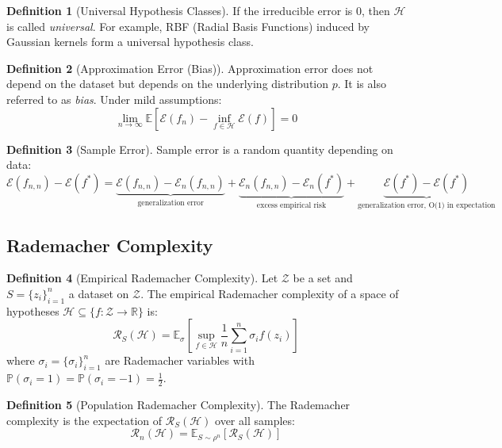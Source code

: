 \documentclass[12pt,a4paper]{article}
\theoremstyle{definition}
\newtheorem{definition}{Definition}[section]
\begin{document}
\begin{definition}[Universal Hypothesis Classes]
If the irreducible error is 0, then $\mathcal{H}$ is called \textit{universal}. For example, RBF (Radial Basis Functions) induced by Gaussian kernels form a universal hypothesis class.
\end{definition}

\begin{definition}[Approximation Error (Bias)]
Approximation error does not depend on the dataset but depends on the underlying distribution $p$. It is also referred to as \textit{bias}. Under mild assumptions:
\[
\lim_{n \to \infty} \mathbb{E}[\mathcal{E}(f_n) - \inf_{f \in \mathcal{H}} \mathcal{E}(f)] = 0
\]
\end{definition}

\begin{definition}[Sample Error]
Sample error is a random quantity depending on data:
\[
\mathcal{E}(f_{n,n}) - \mathcal{E}(f^*) = \underbrace{\mathcal{E}(f_{n,n}) - \mathcal{E}_n(f_{n,n})}_{\text{generalization error}} + \underbrace{\mathcal{E}_n(f_{n,n}) - \mathcal{E}_n(f^*)}_{\text{excess empirical risk}} + \underbrace{\mathcal{E}(f^*) - \mathcal{E}(f^*)}_{\text{generalization error, O(1) in expectation}}
\]
\end{definition}

\subsection{Rademacher Complexity}

\begin{definition}[Empirical Rademacher Complexity]
Let $\mathcal{Z}$ be a set and $S = \{z_i\}_{i=1}^n$ a dataset on $\mathcal{Z}$. The empirical Rademacher complexity of a space of hypotheses $\mathcal{H} \subseteq \{f: \mathcal{Z} \to \mathbb{R}\}$ is:
\[
\mathcal{R}_S(\mathcal{H}) = \mathbb{E}_\sigma \left[\sup_{f \in \mathcal{H}} \frac{1}{n} \sum_{i=1}^n \sigma_i f(z_i)\right]
\]
where $\sigma_i = \{\sigma_i\}_{i=1}^n$ are Rademacher variables with $\mathbb{P}(\sigma_i = 1) = \mathbb{P}(\sigma_i = -1) = \frac{1}{2}$.
\end{definition}

\begin{definition}[Population Rademacher Complexity]
The Rademacher complexity is the expectation of $\mathcal{R}_S(\mathcal{H})$ over all samples:
\[
\mathcal{R}_n(\mathcal{H}) = \mathbb{E}_{S \sim \rho^n}[\mathcal{R}_S(\mathcal{H})]
\]
\end{definition}
\end{document}
